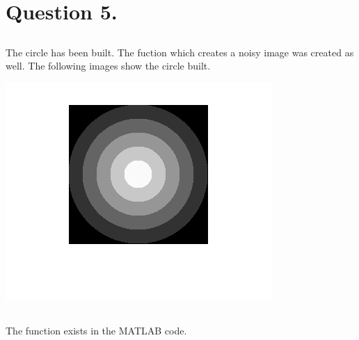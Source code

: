 \documentclass[a4paper]{iacas}
\begin{document}
\newpage
\section{Question 5.}
\subsection{}
The circle has been built. The fuction which creates a noisy image was created as well. The following images show the circle built.


\vskip 0.1in
\begin{minipage}{0.5\textwidth}
\centering
	\includegraphics[scale=0.8]{output/q5/circle.png}
\end{minipage}
\vskip 0.1in

\subsection{}
The function exists in the MATLAB code.
\end{document}
